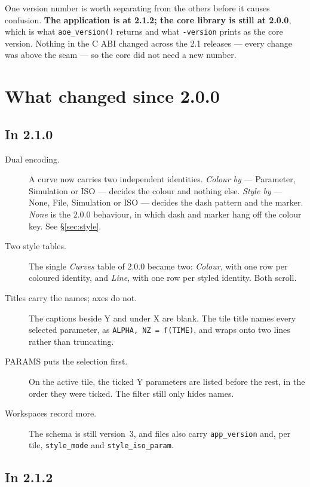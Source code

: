 \documentclass[11pt,a4paper,oneside]{report}
\newcommand{\appver}{2.1.2}
\newcommand{\code}[1]{\texttt{#1}}
\begin{document}
One version number is worth separating from the others before it causes
confusion. \textbf{The application is at \appver; the core library is still at
2.0.0}, which is what \code{aoe\_version()} returns and what
\code{-version} prints as the core version. Nothing in the C ABI changed
across the 2.1 releases --- every change was above the seam --- so the core did
not need a new number.

\chapter{What changed since 2.0.0}
\label{ch:whatsnew}

\section{In 2.1.0}

\begin{description}
\item[Dual encoding.] A curve now carries two independent identities. \emph{Colour by}
  --- Parameter, Simulation or ISO --- decides the colour and nothing else.
  \emph{Style by} --- None, File, Simulation or ISO --- decides the dash pattern
  and the marker. \emph{None} is the 2.0.0 behaviour, in which dash and marker
  hang off the colour key. See \S\ref{sec:style}.
\item[Two style tables.] The single \emph{Curves} table of 2.0.0 became two: \emph{Colour},
  with one row per coloured identity, and \emph{Line}, with one row per styled
  identity. Both scroll.
\item[Titles carry the names; axes do not.] The captions beside Y and under X are
  blank. The tile title names every selected parameter, as
  \code{ALPHA, NZ = f(TIME)}, and wraps onto two lines rather than truncating.
\item[PARAMS puts the selection first.] On the active tile, the ticked Y parameters
  are listed before the rest, in the order they were ticked. The filter still
  only hides names.
\item[Workspaces record more.] The schema is still version~3, and files also carry
  \code{app\_version} and, per tile, \code{style\_mode} and
  \code{style\_iso\_param}.
\end{description}

\section{In \appver}
\end{document}
